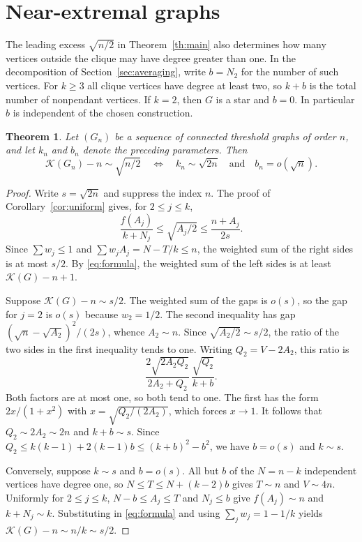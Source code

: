 \documentclass[11pt]{amsart}
\newtheorem{theorem}{Theorem}[section]
\numberwithin{equation}{section}
\newcommand{\K}{\mathcal K}
\begin{document}
\section{Near-extremal graphs}\label{sec:stability}
The leading excess $\sqrt{n/2}$ in Theorem~\ref{th:main} also
determines how many vertices outside the clique may have degree
greater than one. In the decomposition of Section~\ref{sec:averaging},
write $b=N_2$ for the number of such vertices. For $k\ge3$ all
clique vertices have degree at least two, so $k+b$ is the total number
of nonpendant vertices. If $k=2$, then $G$ is a star and $b=0$.
In particular $b$ is independent of the chosen construction.

\begin{theorem}\label{th:stability}
Let $(G_n)$ be a sequence of connected threshold graphs of order $n$,
and let $k_n$ and $b_n$ denote the preceding parameters. Then
\[
 \K(G_n)-n\sim\sqrt{n/2}\quad\Longleftrightarrow\quad
 k_n\sim\sqrt{2n}\quad\text{and}\quad b_n=o(\sqrt n).
\]
\end{theorem}
\begin{proof}
Write $s=\sqrt{2n}$ and suppress the index $n$. The proof of
Corollary~\ref{cor:uniform} gives, for $2\le j\le k$,
\[
 \frac{f(A_j)}{k+N_j}\le\sqrt{A_j/2}\le\frac{n+A_j}{2s}.
\]
Since $\sum w_j\le1$ and $\sum w_jA_j=N-T/k\le n$, the weighted
sum of the right sides is at most $s/2$. By \eqref{eq:formula},
the weighted sum of the left sides is at least $\K(G)-n+1$.

Suppose $\K(G)-n\sim s/2$. The weighted sum of the gaps is $o(s)$,
so the gap for $j=2$ is $o(s)$ because $w_2=1/2$. The second
inequality has gap $(\sqrt n-\sqrt{A_2})^2/(2s)$, whence $A_2\sim n$.
Since $\sqrt{A_2/2}\sim s/2$, the ratio of the two sides in the
first inequality tends to one. Writing $Q_2=V-2A_2$, this ratio is
\[
 \frac{2\sqrt{2A_2Q_2}}{2A_2+Q_2}\,
 \frac{\sqrt{Q_2}}{k+b}.
\]
Both factors are at most one, so both tend to one. The first has the
form $2x/(1+x^2)$ with $x=\sqrt{Q_2/(2A_2)}$, which forces $x\to1$.
It follows that
$Q_2\sim 2A_2\sim 2n$ and $k+b\sim s$. Since
$Q_2\le k(k-1)+2(k-1)b\le(k+b)^2-b^2$, we have $b=o(s)$ and $k\sim s$.

Conversely, suppose $k\sim s$ and $b=o(s)$. All but $b$ of the
$N=n-k$ independent vertices have degree one, so $N\le T\le N+(k-2)b$
gives $T\sim n$ and $V\sim4n$. Uniformly for $2\le j\le k$,
$N-b\le A_j\le T$ and $N_j\le b$ give $f(A_j)\sim n$ and
$k+N_j\sim k$. Substituting in \eqref{eq:formula} and using
$\sum_j w_j=1-1/k$ yields $\K(G)-n\sim n/k\sim s/2$.
\end{proof}
\end{document}

